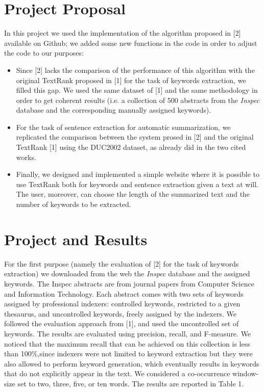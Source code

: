 \documentclass[twoside,twocolumn]{article}
\begin{document}
\section{Project Proposal}
In this project we used the implementation of the algorithm proposed in [2] available on Github; we added some new functions in the code in order to adjust the code to our purposes:
\begin{itemize}
\item Since [2] lacks the comparison of the performance of this algorithm with the original TextRank proposed in [1] for the task of keywords extraction, we filled this gap. We used the same dataset of [1] and the same methodology in order to get coherent results (i.e. a collection of 500 abstracts from the \textit{Inspec} database and the corresponding manually assigned keywords).
\end{itemize}
\begin{itemize}
\item For the task of sentence extraction for automatic summarization, we replicated the comparison between the system prosed in [2] and the original TextRank [1] using the DUC2002 dataset, as already did in the two cited works. 
\end{itemize}
\begin{itemize}
\item Finally, we designed and implemented a simple website where it is possible to use TextRank both for keywords and sentence extraction given a text at will. The user, moreover, can choose the length of the summarized text and the number of keywords to be extracted.
\end{itemize}
\section{Project and Results}
For the first purpose (namely the evaluation of [2] for the task of keywords extraction) we downloaded from the web the \textit{Inspec} database and the assigned keywords. The Inspec abstracts are from journal papers from Computer Science and Information Technology. Each abstract comes with two sets of keywords assigned by professional indexers: controlled keywords, restricted to a given thesaurus, and uncontrolled keywords, freely assigned by the indexers. We followed the evaluation approach from [1], and used the uncontrolled set of keywords. The results are evaluated using precision, recall, and F-measure. We noticed that the maximum recall that can be achieved on this collection is less than 100\%,since indexers were not limited to keyword extraction but they were also allowed to perform keyword generation, which eventually results in keywords that do not explicitly appear in the text. We considered a co-occurrence window-size set to two, three, five, or ten words. The results are reported in Table 1. 
\end{document}
